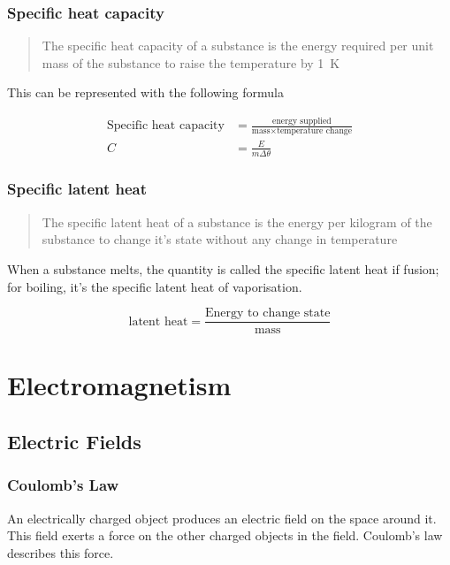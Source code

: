 \documentclass{scrbook}
\begin{document}
\subsection{Specific heat capacity}

	\begin{quote}
		The specific heat capacity of a substance is the energy required per unit mass of the substance to raise the temperature by \SI{1}{\kelvin}
	\end{quote}

	This can be represented with the following formula

	\begin{align*}
		\text{Specific heat capacity} &= \frac{\text{energy supplied}}{\text{mass} \times \text{temperature change}} \\
		C &= \frac{E}{m\Delta\theta}
	\end{align*}

\subsection{Specific latent heat}

	\begin{quote}
		The specific latent heat of a substance is the energy per kilogram of the substance to change it's state without any change in temperature
	\end{quote}

	When a substance melts, the quantity is called the specific latent heat if fusion; for boiling, it's the specific latent heat of vaporisation.

	\[ \text{latent heat} = \frac{\text{Energy to change state}}{\text{mass}} \]

\chapter{Electromagnetism}

\section{Electric Fields}

\subsection{Coulomb's Law}

	An electrically charged object produces an electric field on the space around it. This field exerts a force on the other charged objects in the field. Coulomb's law describes this force.
\end{document}
